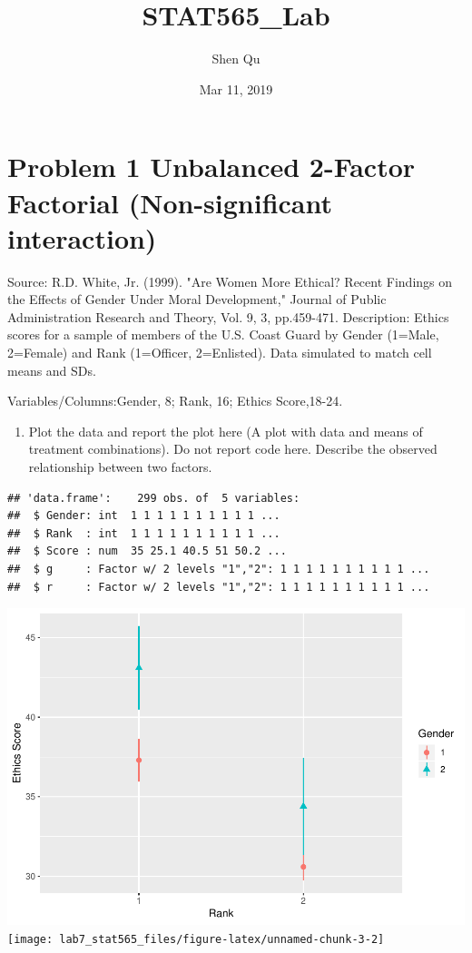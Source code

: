 \documentclass[]{article}
\title{STAT565\_Lab}
\author{Shen Qu}
\date{Mar 11, 2019}
\providecommand{\tightlist}{%
  \setlength{\itemsep}{0pt}\setlength{\parskip}{0pt}}
\begin{document}
\maketitle

\hypertarget{problem-1-unbalanced-2-factor-factorial-non-significant-interaction}{%
\section{Problem 1 Unbalanced 2-Factor Factorial (Non-significant
interaction)}\label{problem-1-unbalanced-2-factor-factorial-non-significant-interaction}}

\textcolor[rgb]{0.5,0.5,0.5}{Source: R.D. White, Jr. (1999). "Are Women More Ethical? Recent Findings on the Effects of Gender Under Moral Development," Journal of Public Administration Research and Theory, Vol. 9, 3, pp.459-471. Description: Ethics scores for a sample of members of the U.S. Coast Guard by Gender (1=Male, 2=Female) and Rank (1=Officer, 2=Enlisted). Data simulated to match cell means and SDs.}

\textcolor[rgb]{0.5,0.5,0.5}{Variables/Columns:Gender, 8; Rank, 16; Ethics Score,18-24.}

\begin{enumerate}
\def\labelenumi{(\alph{enumi})}
\tightlist
\item
  \textcolor[rgb]{0.5,0.5,0.5}{Plot the data and report the plot here (A plot with data and means of treatment combinations). Do not report code here. Describe the observed relationship between two factors.}
\end{enumerate}

\begin{verbatim}
## 'data.frame':    299 obs. of  5 variables:
##  $ Gender: int  1 1 1 1 1 1 1 1 1 1 ...
##  $ Rank  : int  1 1 1 1 1 1 1 1 1 1 ...
##  $ Score : num  35 25.1 40.5 51 50.2 ...
##  $ g     : Factor w/ 2 levels "1","2": 1 1 1 1 1 1 1 1 1 1 ...
##  $ r     : Factor w/ 2 levels "1","2": 1 1 1 1 1 1 1 1 1 1 ...
\end{verbatim}

\includegraphics[width=0.3\linewidth]{lab7_stat565_files/figure-latex/unnamed-chunk-3-1}
\texttt{[image: lab7\_stat565\_files/figure-latex/unnamed-chunk-3-2]}
\end{document}

